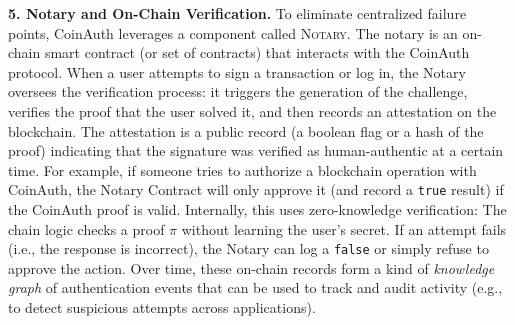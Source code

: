 \documentclass[10pt,letterpaper]{article}
\begin{document}
\noindent \textbf{5. Notary and On-Chain Verification.} To eliminate centralized failure points, CoinAuth leverages a component called \textsc{Notary}. The notary is an on-chain smart contract (or set of contracts) that interacts with the CoinAuth protocol. When a user attempts to sign a transaction or log in, the Notary oversees the verification process: it triggers the generation of the challenge, verifies the proof that the user solved it, and then records an attestation on the blockchain. The attestation is a public record (a boolean flag or a hash of the proof) indicating that the signature was verified as human-authentic at a certain time. For example, if someone tries to authorize a blockchain operation with CoinAuth, the Notary Contract will only approve it (and record a \texttt{true} result) if the CoinAuth proof is valid. Internally, this uses zero-knowledge verification: The chain logic checks a proof \( \pi \) without learning the user’s secret. If an attempt fails (i.e., the response is incorrect), the Notary can log a \texttt{false} or simply refuse to approve the action. Over time, these on-chain records form a kind of \emph{knowledge graph} of authentication events that can be used to track and audit activity (e.g., to detect suspicious attempts across applications).
\end{document}
